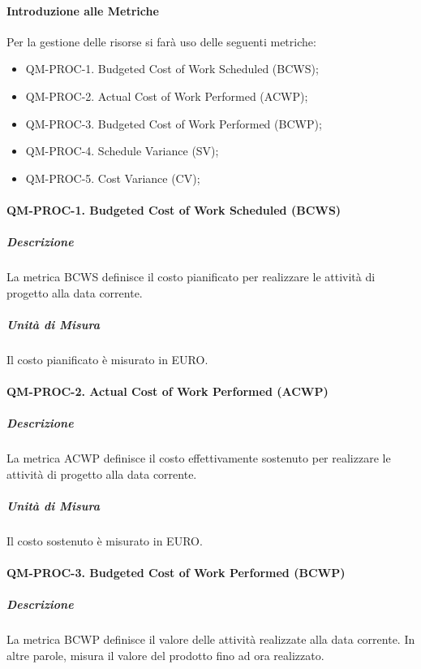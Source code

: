		\paragraph{Introduzione alle Metriche}

		Per la gestione delle risorse si farà uso delle seguenti metriche:

		\begin{itemize}
			\item QM-PROC-1. Budgeted Cost of Work Scheduled (BCWS);
			\item QM-PROC-2. Actual Cost of Work Performed (ACWP);
			\item QM-PROC-3. Budgeted Cost of Work Performed (BCWP);
			\item QM-PROC-4. Schedule Variance (SV);
			\item QM-PROC-5. Cost Variance (CV);
		\end{itemize}

		\paragraph{QM-PROC-1. Budgeted Cost of Work Scheduled (BCWS)}

			\subparagraph{Descrizione}
			La metrica BCWS definisce il costo pianificato per realizzare le attività di progetto alla data corrente. 

			\subparagraph{Unità di Misura}
			Il costo pianificato è misurato in EURO.

		\paragraph{QM-PROC-2. Actual Cost of Work Performed (ACWP)}

			\subparagraph{Descrizione}
			La metrica ACWP definisce il costo effettivamente sostenuto per realizzare le attività di progetto alla data corrente. 

			\subparagraph{Unità di Misura}
			Il costo sostenuto è misurato in EURO.

		\paragraph{QM-PROC-3. Budgeted Cost of Work Performed (BCWP)}

			\subparagraph{Descrizione}
			La metrica BCWP definisce il valore delle attività realizzate alla data corrente. In altre parole, misura il valore del prodotto fino ad ora realizzato.

